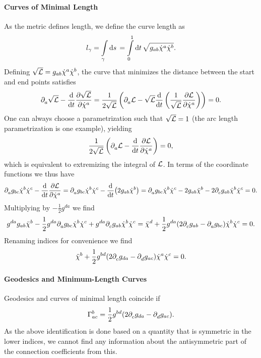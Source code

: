 \paragraph{Curves of Minimal Length}
As the metric defines length, we define the curve length as
\begin{align*}
	l_{\gamma} = \int\limits_{\gamma}^{}\dd{s}{} = \int\limits_{0}^{1}\dd{t}{\sqrt{g_{ab}\dot{\chi}^{a}\dot{\chi}^{b}}}.
\end{align*}
Defining $\sqrt{\mathcal{L}} = g_{ab}\dot{\chi}^{a}\dot{\chi}^{b}$, the curve that minimizes the distance between the start and end points satisfies
\begin{align*}
	\partial^{}_{a}{\sqrt{\mathcal{L}}} - \dv{t}\pdv{\sqrt{\ensuremath{\mathcal{L}}}}{\dot{\chi}^{a}} = \frac{1}{2\sqrt{\mathcal{L}}}\left(\partial^{}_{a}{\mathcal{L}} - \sqrt{\mathcal{L}}\dv{t}\left(\frac{1}{\sqrt{\mathcal{L}}}\pdv{\ensuremath{\mathcal{L}}}{\dot{\chi}^{a}}\right)\right) = 0.
\end{align*}
One can always choose a parametrization such that $\sqrt{\mathcal{L}} = 1$ (the arc length parametrization is one example), yielding
\begin{align*}
	\frac{1}{2\sqrt{\mathcal{L}}}\left(\partial^{}_{a}{\mathcal{L}} - \dv{t}\pdv{\ensuremath{\mathcal{L}}}{\dot{\chi}^{a}}\right) = 0,
\end{align*}
which is equivalent to extremizing the integral of $\mathcal{L}$. In terms of the coordinate functions we thus have
\begin{align*}
	\partial^{}_{a}{g_{bc}}\dot{\chi}^{b}\dot{\chi}^{c} - \dv{t}\pdv{\ensuremath{\mathcal{L}}}{\dot{\chi}^{a}} = \partial^{}_{a}{g_{bc}}\dot{\chi}^{b}\dot{\chi}^{c} - \dv{t}(2g_{ab}\dot{\chi}^{b}) = \partial^{}_{a}{g_{bc}}\dot{\chi}^{b}\dot{\chi}^{c} - 2g_{ab}\ddot{\chi}^{b} - 2\partial^{}_{c}{g_{ab}}\dot{\chi}^{b}\dot{\chi}^{c} = 0.
\end{align*}
Multiplying by $-\frac{1}{2}g^{da}$ we find
\begin{align*}
	g^{da}g_{ab}\ddot{\chi}^{b} - \frac{1}{2}g^{da}\partial^{}_{a}{g_{bc}}\dot{\chi}^{b}\dot{\chi}^{c} + g^{da}\partial^{}_{c}{g_{ab}}\dot{\chi}^{b}\dot{\chi}^{c} = \ddot{\chi}^{d} + \frac{1}{2}g^{da}(2\partial^{}_{c}{g_{ab}} - \partial^{}_{a}{g_{bc}})\dot{\chi}^{b}\dot{\chi}^{c} = 0.
\end{align*}
Renaming indices for convenience we find
\begin{align*}
	\ddot{\chi}^{b} + \frac{1}{2}g^{bd}(2\partial^{}_{c}{g_{da}} - \partial^{}_{d}{g_{ac}})\dot{\chi}^{a}\dot{\chi}^{c} = 0.
\end{align*}

\paragraph{Geodesics and Minimum-Length Curves}
Geodesics and curves of minimal length coincide if
\begin{align*}
	\chris{b}{a}{c} = \frac{1}{2}g^{bd}(2\del{}{c}{g_{da}} - \del{}{d}{g_{ac}}).
\end{align*}
As the above identification is done based on a quantity that is symmetric in the lower indices, we cannot find any information about the antisymmetric part of the connection coefficients from this.

